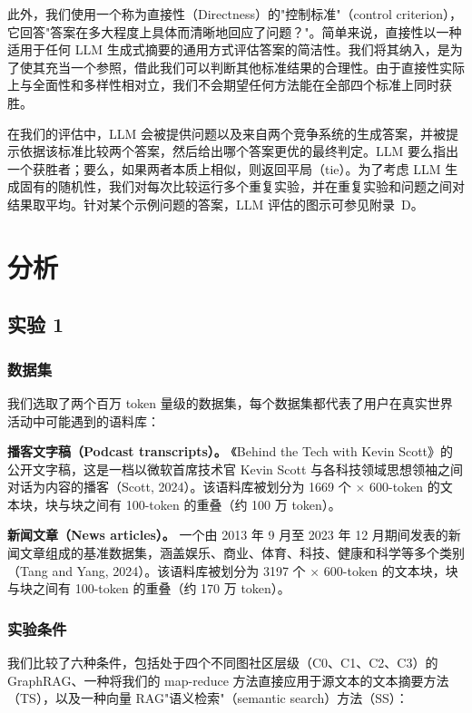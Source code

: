 \documentclass[11pt,UTF8,fontset=fandol]{ctexart}
\begin{document}
此外，我们使用一个称为直接性（Directness）的"控制标准"（control criterion），它回答"答案在多大程度上具体而清晰地回应了问题？"。简单来说，直接性以一种适用于任何 LLM 生成式摘要的通用方式评估答案的简洁性。我们将其纳入，是为了使其充当一个参照，借此我们可以判断其他标准结果的合理性。由于直接性实际上与全面性和多样性相对立，我们不会期望任何方法能在全部四个标准上同时获胜。

在我们的评估中，LLM 会被提供问题以及来自两个竞争系统的生成答案，并被提示依据该标准比较两个答案，然后给出哪个答案更优的最终判定。LLM 要么指出一个获胜者；要么，如果两者本质上相似，则返回平局（tie）。为了考虑 LLM 生成固有的随机性，我们对每次比较运行多个重复实验，并在重复实验和问题之间对结果取平均。针对某个示例问题的答案，LLM 评估的图示可参见附录~D。

\section{分析}

\subsection{实验 1}

\subsubsection{数据集}

我们选取了两个百万 token 量级的数据集，每个数据集都代表了用户在真实世界活动中可能遇到的语料库：

\textbf{播客文字稿（Podcast transcripts）。} 《Behind the Tech with Kevin Scott》的公开文字稿，这是一档以微软首席技术官 Kevin Scott 与各科技领域思想领袖之间对话为内容的播客（Scott, 2024）。该语料库被划分为 1669 个 $\times$ 600-token 的文本块，块与块之间有 100-token 的重叠（约 100 万 token）。

\textbf{新闻文章（News articles）。} 一个由 2013 年 9 月至 2023 年 12 月期间发表的新闻文章组成的基准数据集，涵盖娱乐、商业、体育、科技、健康和科学等多个类别（Tang and Yang, 2024）。该语料库被划分为 3197 个 $\times$ 600-token 的文本块，块与块之间有 100-token 的重叠（约 170 万 token）。

\subsubsection{实验条件}

我们比较了六种条件，包括处于四个不同图社区层级（C0、C1、C2、C3）的 GraphRAG、一种将我们的 map-reduce 方法直接应用于源文本的文本摘要方法（TS），以及一种向量 RAG"语义检索"（semantic search）方法（SS）：
\end{document}
